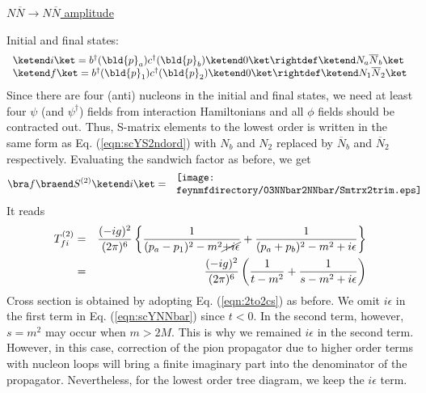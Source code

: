 \bigskip
\noindent
\underline{$N\overline{N} \to N\overline{N}$ amplitude}

\bigskip

Initial and final states:
\begin{eqnarray}
\begin{array}{l}
\ketend i \ket
=
b^\dagger(\bld{p}_a) c^\dagger(\bld{p}_b) \ketend 0 \ket
\rightdef
\ketend N_a \overline{N}_b \ket
\\
\ketend f \ket
=
b^\dagger(\bld{p}_1) c^\dagger(\bld{p}_2) \ketend 0 \ket
\rightdef
\ketend N_1 \overline{N}_2 \ket
\end{array}
\label{eqn:scYNNbarNNbarinit}
\end{eqnarray}
Since there are four (anti) nucleons in the initial and final states, we need at least 
four $\psi$ (and $\psi^\dagger$) fields from interaction Hamiltonians and all $\phi$ fields should
be contracted out. Thus, S-matrix elements to the lowest order is written 
in the same form as Eq. (\ref{eqn:scYS2ndord}) with $N_b$ and $N_2$ replaced by
$\overline{N}_b$ and $\overline{N}_2$ respectively.
Evaluating the sandwich factor as before,
we get
\begin{eqnarray}
\bra f \braend S^{(2)} \ketend i \ket
&=&
\parbox{80mm}{
\texttt{[image: \\feynmfdirectory/03NNbar2NNbar/Smtrx2trim.eps]}
}
\nonumber\\
\label{eqn:scYSmtrxFeynmDiagNNbar}
\end{eqnarray}
It reads
\begin{eqnarray}
T_{fi}^{(2)}
&=&
\frac{(-i g)^2}{(2\pi)^6} 
\left\{
\frac{1}{(p_a - p_1)^2 - m^2 \cancel{+ i\epsilon}}
+
\frac{1}{(p_a + p_b)^2 - m^2 + i\epsilon}
\right\}
\nonumber\\
&=&
\frac{(-i g)^2}{(2\pi)^6} 
\left(
\frac{1}{t - m^2}
+
\frac{1}{s - m^2 + i\epsilon}
\right)
\label{eqn:scYNNbar}
\end{eqnarray}
Cross section is obtained by adopting Eq. (\ref{eqn:2to2cs}) as before.
We omit $i \epsilon$ in the first term in Eq. (\ref{eqn:scYNNbar}) since
$t < 0$. In the second term, however, $s = m^2$ may occur when
$m > 2M$. This is why we remained $i \epsilon$ in the second term.
However, in this case, correction of the pion propagator due to higher
order terms with nucleon loops will bring a finite imaginary part into the
denominator of the propagator. Nevertheless, for the lowest order
tree diagram, we keep the $i \epsilon$ term. 

